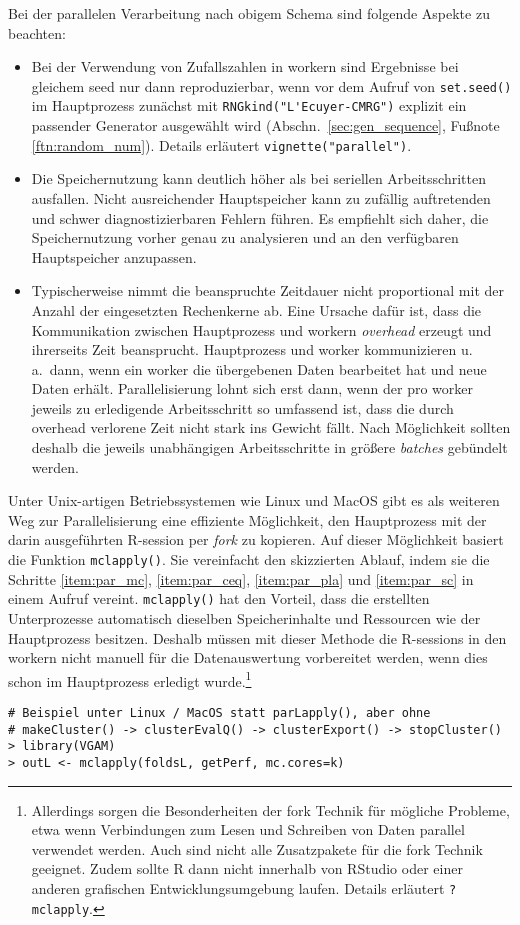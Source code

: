 Bei der parallelen Verarbeitung nach obigem Schema sind folgende Aspekte zu beachten:
\begin{itemize}
\item Bei der Verwendung von Zufallszahlen in workern sind Ergebnisse bei gleichem seed nur dann reproduzierbar, wenn vor dem Aufruf von \lstinline!set.seed()! im Hauptprozess zunächst mit \lstinline!RNGkind("L'Ecuyer-CMRG")! explizit ein passender Generator ausgewählt wird (Abschn.\ \ref{sec:gen_sequence}, Fußnote \ref{ftn:random_num}). Details erläutert \lstinline!vignette("parallel")!.
\item Die Speichernutzung kann deutlich höher als bei seriellen Arbeitsschritten ausfallen. Nicht ausreichender Hauptspeicher kann zu zufällig auftretenden und schwer diagnostizierbaren Fehlern führen. Es empfiehlt sich daher, die Speichernutzung vorher genau zu analysieren und an den verfügbaren Hauptspeicher anzupassen.
\item Typischerweise nimmt die beanspruchte Zeitdauer nicht proportional mit der Anzahl der eingesetzten Rechenkerne ab. Eine Ursache dafür ist, dass die Kommunikation zwischen Hauptprozess und workern \emph{overhead} erzeugt und ihrerseits Zeit beansprucht. Hauptprozess und worker kommunizieren u.\,a.\ dann, wenn ein worker die übergebenen Daten bearbeitet hat und neue Daten erhält. Parallelisierung lohnt sich erst dann, wenn der pro worker jeweils zu erledigende Arbeitsschritt so umfassend ist, dass die durch overhead verlorene Zeit nicht stark ins Gewicht fällt. Nach Möglichkeit sollten deshalb die jeweils unabhängigen Arbeitsschritte in größere \emph{batches} gebündelt werden.
\end{itemize}

Unter Unix-artigen Betriebssystemen wie Linux und MacOS gibt es als weiteren Weg zur Parallelisierung eine effiziente Möglichkeit, den Hauptprozess mit der darin ausgeführten R-session per \emph{fork} zu kopieren. Auf dieser Möglichkeit basiert die Funktion \lstinline!mclapply()!. Sie vereinfacht den skizzierten Ablauf, indem sie die Schritte \ref{item:par_mc}, \ref{item:par_ceq}, \ref{item:par_pla} und \ref{item:par_sc} in einem Aufruf vereint. \lstinline!mclapply()! hat den Vorteil, dass die erstellten Unterprozesse automatisch dieselben Speicherinhalte und Ressourcen wie der Hauptprozess besitzen. Deshalb müssen mit dieser Methode die R-sessions in den workern nicht manuell für die Datenauswertung vorbereitet werden, wenn dies schon im Hauptprozess erledigt wurde.\footnote{Allerdings sorgen die Besonderheiten der fork Technik für mögliche Probleme, etwa wenn Verbindungen zum Lesen und Schreiben von Daten parallel verwendet werden. Auch sind nicht alle Zusatzpakete für die fork Technik geeignet. Zudem sollte R dann nicht innerhalb von RStudio oder einer anderen grafischen Entwicklungsumgebung laufen. Details erläutert \lstinline!?mclapply!.}
\begin{lstlisting}
# Beispiel unter Linux / MacOS statt parLapply(), aber ohne
# makeCluster() -> clusterEvalQ() -> clusterExport() -> stopCluster()
> library(VGAM)
> outL <- mclapply(foldsL, getPerf, mc.cores=k)
\end{lstlisting}

